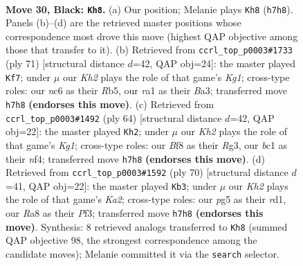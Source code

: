 \documentclass[11pt]{article}
\begin{document}
\clearpage

\begin{figure}[p]\centering
\begin{subfigure}{0.46\textwidth}\centering
\resizebox{\linewidth}{!}{%
\newchessgame
\chessboard[
  setfen={r4b2/p6k/2N3p1/6P1/PP3P2/2N5/8/R1B1K3 b Q - 0 30},
  showmover=false,
  pgfstyle=straightmove, color=movearrow, markmove={h7-h8}
]}
\caption{}
\end{subfigure}\hfill
\begin{subfigure}{0.46\textwidth}\centering
\resizebox{\linewidth}{!}{%
\newchessgame
\chessboard[
  setfen={6k1/6p1/5p2/pr6/7P/bPR1BP1K/5P2/8 b - - 3 36},
  showmover=false,
  pgfstyle=straightmove, color=movearrow, markmove={g8-f7}
]}
\caption{}
\end{subfigure}
\\[4pt]
\begin{subfigure}{0.46\textwidth}\centering
\resizebox{\linewidth}{!}{%
\newchessgame
\chessboard[
  setfen={1R6/p5pk/r4p2/7p/4Pn2/P5R1/5P2/6K1 w - - 2 33},
  showmover=false,
  pgfstyle=straightmove, color=movearrow, markmove={g1-h2}
]}
\caption{}
\end{subfigure}\hfill
\begin{subfigure}{0.46\textwidth}\centering
\resizebox{\linewidth}{!}{%
\newchessgame
\chessboard[
  setfen={3b4/3B1pk1/R2P2p1/4p3/8/3nBP2/KP6/3r4 w - - 2 36},
  showmover=false,
  pgfstyle=straightmove, color=movearrow, markmove={a2-b3}
]}
\caption{}
\end{subfigure}
\caption{\textbf{Move 30, Black: \texttt{Kh8}.} (a) Our position; Melanie plays \texttt{Kh8} (\texttt{h7h8}). Panels (b)--(d) are the retrieved master positions whose correspondence most drove this move (highest QAP objective among those that transfer to it). (b) Retrieved from \texttt{ccrl\_top\_p0003\#1733} (ply 71) [structural distance $d$=42, QAP obj=24]: the master played \texttt{Kf7}; under $\mu$ our \emph{Kh2} plays the role of that game's \emph{Kg1}; cross-type roles: our \emph{n}c6 as their \emph{R}b5, our \emph{r}a1 as their \emph{B}a3; transferred move \texttt{h7h8} \textbf{(endorses this move)}. (c) Retrieved from \texttt{ccrl\_top\_p0003\#1492} (ply 64) [structural distance $d$=42, QAP obj=22]: the master played \texttt{Kh2}; under $\mu$ our \emph{Kh2} plays the role of that game's \emph{Kg1}; cross-type roles: our \emph{B}f8 as their \emph{R}g3, our \emph{b}c1 as their \emph{n}f4; transferred move \texttt{h7h8} \textbf{(endorses this move)}. (d) Retrieved from \texttt{ccrl\_top\_p0003\#1592} (ply 70) [structural distance $d$=41, QAP obj=22]: the master played \texttt{Kb3}; under $\mu$ our \emph{Kh2} plays the role of that game's \emph{Ka2}; cross-type roles: our \emph{p}g5 as their \emph{r}d1, our \emph{R}a8 as their \emph{P}f3; transferred move \texttt{h7h8} \textbf{(endorses this move)}. Synthesis: 8 retrieved analogs transferred to \texttt{Kh8} (summed QAP objective 98, the strongest correspondence among the candidate moves); Melanie committed it via the \texttt{search} selector.}
\label{fig:thought-m59}
\end{figure}
\end{document}
